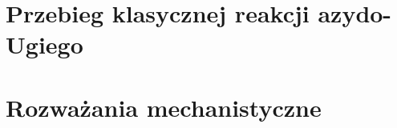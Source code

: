 \section{Przebieg klasycznej reakcji azydo-Ugiego}\label{numeric:classical}
\section{Rozważania mechanistyczne}\label{numeric:mechanism}
